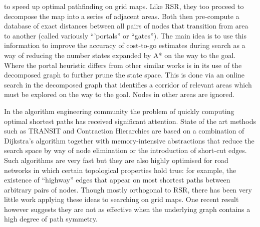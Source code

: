 to speed up optimal pathfinding on grid maps.  Like RSR, they too proceed to
decompose the map into a series of adjacent areas.  Both then pre-compute a
database of exact distances between all pairs of nodes that transition from area
to another (called variously ``'portals'' or ``gates'').  The main idea
is to use this information to improve the accuracy of cost-to-go estimates
during search as a way of reducing the number states expanded by A* on the way
to the goal. Where the portal heuristic differs from other similar works
\cite{bjornsson06,sturtevant09,felner09} is in its use of the decomposed
graph to further prune the state space. This is done via an online search in the
decomposed graph that identifies a corridor of relevant areas which must be 
explored on the way to the goal. Nodes in other areas are ignored.
\par
In the algorithm engineering community the problem of quickly computing optimal
shortest paths has received significant attention.  State of the art methods
such as TRANSIT \cite{bast06} and Contraction Hierarchies \cite{geisberger08}
are based on a combination of Dijkstra's algorithm together with
memory-intensive abstractions that reduce the search space by way of node
elimination or the introduction of short-cut edges.  Such algorithms are very
fast but they are also highly optimised for road networks in which certain
topological properties hold true: for example, the existence of ``highway''
edges that appear on most shortest paths between arbitrary pairs of nodes.
Though mostly orthogonal to RSR, there has been very little work applying these
ideas to searching on grid maps. One recent result however \cite{sturtevant10}
suggests they are not as effective when the underlying graph contains a high
degree of path symmetry.
